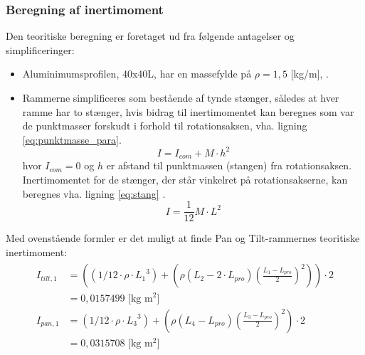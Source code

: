 \subsubsection{Beregning af inertimoment}
Den teoritiske beregning er foretaget ud fra følgende antagelser og simplificeringer:
\begin{itemize}
\item Aluminimumsprofilen, 40x40L, har en massefylde på \(\rho=1,5\) [kg/m], \citep[Kap. 2 side. 4]{alu_profil_desitet}.
\item Rammerne simplificeres som bestående af tynde stænger, således at hver ramme har to stænger, hvis bidrag
til inertimomentet kan beregnes som var de punktmasser forskudt i forhold til rotationsaksen\citep[Side. 254, ligning 10-36]{fund_of_physics},
vha. ligning \ref{eq:punktmasse_para}.
\begin{equation}
I={ I }_{ com }+M\cdot { h }^{ 2 }
\label{eq:punktmasse_para} 
\end{equation}
hvor \({I_{com}} = 0\) og \(h\) er afstand til punktmassen (stangen) fra rotationsaksen.
Inertimomentet for de stænger, der står vinkelret på rotationsakserne, kan beregnes vha. ligning \ref{eq:stang}
\citep[Side. 255, tabel 10-2e]{fund_of_physics}.
\begin{equation}
I=\frac { 1 }{ 12 } M\cdot { L }^{ 2 }
\label{eq:stang} 
\end{equation}
\end{itemize}

Med ovenstående formler er det muligt at finde Pan og Tilt-rammernes teoritiske inertimoment:
\begin{align}
\label{eq:inerti_tilt_pan}
\begin{split}
{ I }_{ tilt,1 } &= \left( \left( 1/12\cdot \rho \cdot { {L_{1}} }^{ 3 } \right) +\left( \rho \left( {L_{2}}-2\cdot {L_{pro}} \right) { \left( \frac { {L_{1}}-{L_{pro}}}{ 2 }  \right)  }^{ 2 } \right)  \right) \cdot 2
\\
 &= 0,0157499 \text{ [kg m$^2$]}
\\
{ I }_{ pan,1 }&=\left( 1/12\cdot \rho \cdot { { L }_{ 3 } }^{ 3 } \right) +\left( \rho \left( { L }_{ 4 }-{ L }_{ pro } \right) { \left( \frac { { L }_{ 3 }-{ L }_{ pro } }{ 2 }  \right)  }^{ 2 } \right) \cdot 2
\\
 &=0,0315708 \text{ [kg m$^2$]}
\end{split}
\end{align}

